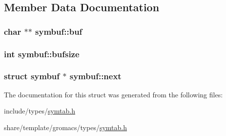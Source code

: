 \subsection{\-Member \-Data \-Documentation}
\hypertarget{structsymbuf_a7e068cdb7159f3e035f160d5ec34d455}{
\subsubsection[{buf}]{\setlength{\rightskip}{0pt plus 5cm}char $\ast$$\ast$ {\bf symbuf\-::buf}}}\label{structsymbuf_a7e068cdb7159f3e035f160d5ec34d455}
\hypertarget{structsymbuf_a425fb9fd6079675c20aa24a16cd7bf5e}{
\subsubsection[{bufsize}]{\setlength{\rightskip}{0pt plus 5cm}int {\bf symbuf\-::bufsize}}}\label{structsymbuf_a425fb9fd6079675c20aa24a16cd7bf5e}
\hypertarget{structsymbuf_a85f0768f300a2b2174af951f4f5c5115}{
\subsubsection[{next}]{\setlength{\rightskip}{0pt plus 5cm}struct {\bf symbuf} $\ast$ {\bf symbuf\-::next}}}\label{structsymbuf_a85f0768f300a2b2174af951f4f5c5115}


\-The documentation for this struct was generated from the following files\-:\begin{DoxyCompactItemize}
\item 
include/types/\hyperlink{include_2types_2symtab_8h}{symtab.\-h}\item 
share/template/gromacs/types/\hyperlink{share_2template_2gromacs_2types_2symtab_8h}{symtab.\-h}\end{DoxyCompactItemize}
